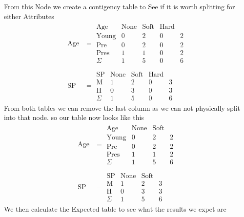 \documentclass[12pt,english]{article}
\begin{document}
From this Node we create a contigency table to See if it is worth splitting for either Attributes
\begin{equation}\tag{2}\label{eq:6}
\begin{split}
\mbox{Age} &= 
\begin{array}{c|ccc|c}
\mbox{Age}   & \mbox{None} & \mbox{Soft} & \mbox{Hard} & \\
\hline
\mbox{Young} & 0 & 2 & 0 & 2 \\
\mbox{Pre}     & 0 & 2 & 0 & 2\\
\mbox{Pres}   & 1 & 1 & 0 & 2\\
\hline
\Sigma           & 1 & 5 & 0 & 6
\end{array}
\\
\\
\mbox{SP} &= 
\begin{array}{c|ccc|c}
\mbox{SP}   & \mbox{None} & \mbox{Soft} & \mbox{Hard} & \\
\hline
\mbox{M} & 1 & 2 & 0 & 3 \\
\mbox{H} & 0 & 3 & 0 & 3\\
\hline
\Sigma     & 1 & 5 & 0 & 6
\end{array}
\end{split}
\end{equation}
From both tables we can remove the last column as we can not physically split into that node.
so our table now looks like this
\begin{equation}\tag{2}\label{eq:6}
\begin{split}
\mbox{Age} &= 
\begin{array}{c|cc|c}
\mbox{Age}   & \mbox{None} & \mbox{Soft} & \\
\hline
\mbox{Young} & 0 & 2 & 2 \\
\mbox{Pre}     & 0 & 2 & 2\\
\mbox{Pres}   & 1 & 1 & 2\\
\hline
\Sigma           & 1 & 5 & 6
\end{array}
\\
\\
\mbox{SP} &= 
\begin{array}{c|cc|c}
\mbox{SP}   & \mbox{None} & \mbox{Soft}& \\
\hline
\mbox{M} & 1 & 2 & 3 \\
\mbox{H} & 0 & 3 & 3\\
\hline
\Sigma     & 1 & 5 & 6
\end{array}
\end{split}
\end{equation}
We then calculate the Expected table to see what the results we expet are
\end{document}
